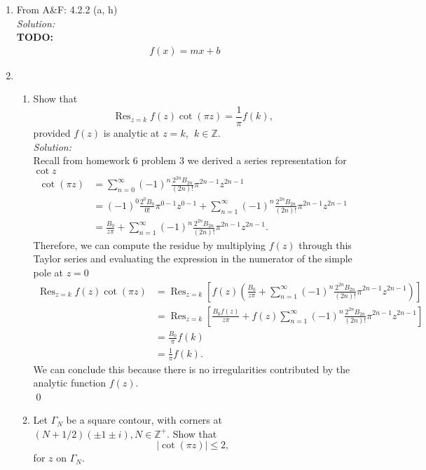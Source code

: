 \documentclass[10pt]{amsart}
\theoremstyle{nonumberplain}
\begin{document}
\begin{enumerate}[label={\bf {\arabic*}:}]
\item From A\&F: 4.2.2 (a, h)\\
 
\noindent
\textit{Solution:} \\
\textbf{TODO:} \\
\begin{align*}
f(x) = mx + b
\end{align*}


\newpage

\item
  \begin{enumerate}
\item  Show that
$$
\operatorname{Res}_{z=k} f(z) \cot (\pi z)=\frac{1}{\pi} f(k),
$$
provided $f(z)$ is analytic at $z=k, ~~k \in \mathbb{Z}$. \\
 
\noindent
\textit{Solution:} \\
Recall from homework 6 problem 3 we derived a series representation for $\cot z$
\begin{align*}
\cot(\pi z) &= \sum_{n = 0}^\infty (-1)^n \frac {2^{2n}B_{2n}}{(2n)!} \pi^{2n - 1} z^{2n - 1} \\
	&= (-1)^0 \frac {2^{0}B_{0}}{0!} \pi^{0 - 1} z^{0 - 1} + \sum_{n = 1}^\infty (-1)^n \frac {2^{2n}B_{2n}}{(2n)!} \pi^{2n - 1} z^{2n - 1} \\
	&= \frac {B_0} {z\pi} + \sum_{n = 1}^\infty (-1)^n \frac {2^{2n}B_{2n}}{(2n)!} \pi^{2n - 1} z^{2n - 1}.
\end{align*}
Therefore, we can compute the residue by multiplying $f(z)$ through this Taylor series and evaluating the expression in the numerator of the simple pole at $z = 0$
\begin{align*}
\operatorname{Res}_{z=k} f(z) \cot (\pi z)
	&= \operatorname{Res}_{z=k} \left[ f(z) \left( \frac {B_0} {z\pi} + \sum_{n = 1}^\infty (-1)^n \frac {2^{2n}B_{2n}}{(2n)!} \pi^{2n - 1} z^{2n - 1}\right) \right] \\
	&= \operatorname{Res}_{z=k} \left[  \frac {B_0 f(z)} {z\pi} + f(z)\sum_{n = 1}^\infty (-1)^n \frac {2^{2n}B_{2n}}{(2n)!} \pi^{2n - 1} z^{2n - 1} \right] \\
	&= \frac{B_0}{\pi} f(k) \\
	&= \frac 1 {\pi} f(k).
\end{align*}
We can conclude this because there is no irregularities contributed by the analytic function $f(z)$. \\
\qed \\

\item Let $\Gamma_N$ be a square contour, with corners at $(N+1 / 2)( \pm 1 \pm i), N \in \mathbb{Z}^{+}$. Show that
$$
|\cot (\pi z)| \leq 2,
$$
for $z$ on $\Gamma_N$.\\
 

\end{enumerate}
\end{enumerate}
\end{document}
